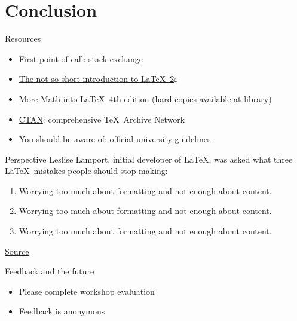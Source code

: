 \section*{Conclusion}
\addtocounter{section}{1}

\begin{frame}{Resources}
\begin{itemize}
\item First point of call: \href{https://tex.stackexchange.com/}{stack exchange}
\item \href{https://tobi.oetiker.ch/lshort/lshort.pdf}{The not so short introduction to \LaTeX\ 2$\varepsilon$}
\item \href{https://link.springer.com/content/pdf/10.1007\%2F978-0-387-68852-7.pdf}{More Math into \LaTeX\ 4th edition} (hard copies available at library)
\item \href{https://www.ctan.org/}{CTAN}: comprehensive \TeX\ Archive Network
\item You should be aware of: \href{https://www.ncl.ac.uk/students/progress/assets/documents/GuidelinesfortheSubmissionandFormatofThesis-January2018.pdf}{official university guidelines}
\end{itemize}
\end{frame}

\begin{frame}{Perspective}
Leslise Lamport, initial developer of \LaTeX, was asked what three \LaTeX\ mistakes people should stop making:
\begin{enumerate}
\item Worrying too much about formatting and not enough about content.
\item Worrying too much about formatting and not enough about content.
\item Worrying too much about formatting and not enough about content.
\end{enumerate}
\href{https://www.microsoft.com/en-us/research/uploads/prod/2016/12/TeX-changed-the-face-of-Mathematics.pdf}{Source}
\end{frame}

\begin{frame}{Feedback and the future}
\begin{itemize}
\item Please complete workshop evaluation
\item Feedback is anonymous
\end{itemize}
\end{frame}

